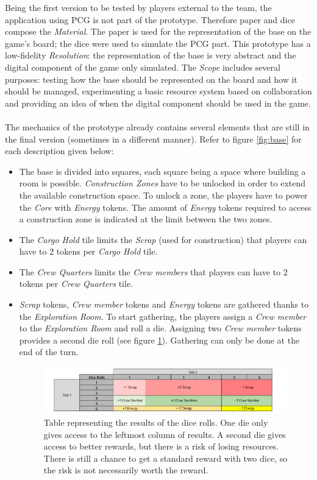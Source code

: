 Being the first version to be tested by players external to the team, the application using PCG is not part of the prototype. Therefore paper and dice compose the \textit{Material}. The paper is used for the representation of the base on the game's board; the dice were used to simulate the PCG part. This prototype has a low-fidelity \textit{Resolution}: the representation of the base is very abstract and the digital component of the game only simulated. The \textit{Scope} includes several purposes: testing how the base should be represented on the board and how it should be managed, experimenting a basic resource system based on collaboration and providing an idea of when the digital component should be used in the game. \\\\
The mechanics of the prototype already contains several elements that are still in the final version (sometimes in a different manner). Refer to figure \ref{fig:base} for each description given below:
\begin{itemize}
\item The base is divided into squares, each square being a space where building a room is possible. \textit{Construction Zones} have to be unlocked in order to extend the available construction space. To unlock a zone, the players have to power the \textit{Core} with \textit{Energy} tokens. The amount of \textit{Energy} tokens required to access a construction zone is indicated at the limit between the two zones.
\item The \textit{Cargo Hold} tile limits the \textit{Scrap} (used for construction) that players can have to 2 tokens per \textit{Cargo Hold} tile.
\item The \textit{Crew Quarters} limits the \textit{Crew members} that players can have to 2 tokens per \textit{Crew Quarters} tile.
\item \textit{Scrap} tokens, \textit{Crew member} tokens and \textit{Energy} tokens are gathered thanks to the \textit{Exploration Room}. To start gathering, the players assign a \textit{Crew member} to the \textit{Exploration Room} and roll a die. Assigning two \textit{Crew member} tokens provides a second die roll (see figure \ref{fig:Dicetable}). Gathering can only be done at the end of the turn.
\begin{figure}[h]
    \centering
    \includegraphics[scale=0.6]{Images/DiceProto1.png}
    \caption{Table representing the results of the dice rolls. One die only gives access to the leftmost column of results. A second die gives access to better rewards, but there is a risk of losing resources. There is still a chance to get a standard reward with two dice, so the risk is not necessarily worth the reward.}
    \label{fig:Dicetable}
\end{figure}
\end{itemize}
